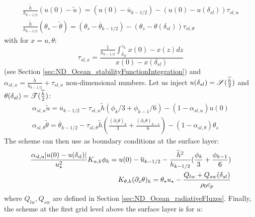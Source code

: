 \begin{equation} \label{eq:ND_Ocean_tmprelation_tilde_bar}
\begin{aligned}
	\frac{\widetilde{h}}{h_{k-1/2}} (u(0) - \widetilde{u}) =
	(u(0) - \overline{u}_{k-1/2}) -
	(u(0) - u(\delta_{sl}))\tau_{sl, u} \\
\frac{\widetilde{h}}{h_{k-1/2}} (\theta_s - \widetilde{\theta}) =
	(\theta_s - \overline{\theta}_{k-1/2}) -
	(\theta_s - \theta(\delta_{sl}))\tau_{sl, \theta}
\end{aligned}
\end{equation}
with for $x = u, \theta$:
\begin{equation}
	\tau_{sl, x} = \frac{\frac{1}{{h_{k-1/2}}}\int_{\delta_{sl}}^{z_k} x(0) - x(z)
	dz}{x(0) - x(\delta_{sl})}
\end{equation} (see Section
\ref{sec:ND_Ocean_stabilityFunctionIntegration})
and
$\alpha_{sl, x} = \frac{\widetilde{h}}{h_{k-1/2}} +
\tau_{sl, x}$
non-dimensional numbers.
Let us inject $u(\delta_{sl}) =
{\cal S}(\frac{\widetilde{h}}{2})$ and
$\theta(\delta_{sl}) = {\cal T}(\frac{\widetilde{h}}{2})$:
\begin{equation}
\begin{aligned}
\label{eq:ND_Ocean_relation_tilde_bar}
\alpha_{sl, u}\widetilde{u} = \overline{u}_{k-1/2} -
	\tau_{sl, u}
\widetilde{h}
	(\phi_k/3 + \phi_{k-1}/6) - (1 - \alpha_{sl, u})u(0)\\
\alpha_{sl, \theta}
\widetilde{\theta}
= \overline{\theta}_{k-1/2} - \tau_{sl, \theta}
	\widetilde{h}(\frac{{(\partial_z \theta)}_k}{3} + \frac{{(\partial_z \theta)}_{k-1}}{6})
 - (1 - \alpha_{sl, \theta})\theta_s
\end{aligned}
\end{equation}
The scheme can then use as boundary conditions at the surface layer:
\begin{equation}
\label{eq:ND_Ocean_boundaryConditionFVfree}
\begin{aligned}
	\frac{\alpha_{\rm sl, u} |u(0) - u(\delta_{\rm sl})|}
	{u_\star^2}K_{u,k} \phi_k =
	u(0) - \overline{u}_{k-1/2} - \frac{\widetilde{h}^2}{h_{k-1/2}}
	(\frac{\phi_k}{3} + \frac{\phi_{k-1}}{6})
	\\
	K_{\theta, k} (\partial_z \theta)_k = 
	\theta_\star u_\star - \frac{Q_{lw} + Q_{sw}(\delta_{sl})}{\rho_0 c_p}
  \end{aligned}
\end{equation}
where $Q_{lw}, Q_{sw}$ are defined in Section
\ref{sec:ND_Ocean_radiativeFluxes}.
Finally, the scheme at the first grid level above
the surface layer is for $u$:
